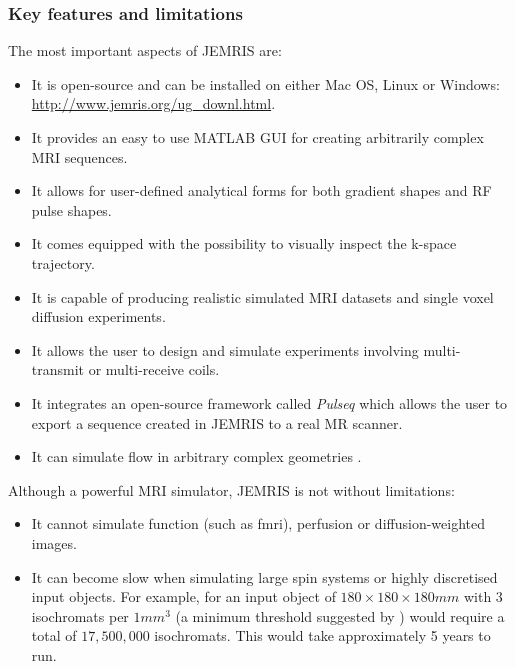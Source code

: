 \subsubsection{Key features and limitations}
The most important aspects of JEMRIS are:
\begin{itemize}
    
    \item It is open-source and can be installed on either Mac OS, Linux or Windows: \url{http://www.jemris.org/ug_downl.html}.
    
    \item It provides an easy to use MATLAB GUI for creating arbitrarily complex MRI sequences.
    
    \item It allows for user-defined analytical forms for both gradient shapes and RF pulse shapes. 
    
    \item It comes equipped with the possibility to visually inspect the k-space trajectory.
    
    \item It is capable of producing realistic simulated MRI datasets and single voxel diffusion experiments.
    
    \item It allows the user to design and simulate experiments involving multi-transmit or multi-receive coils.
    
    \item It integrates an open-source framework called \textit{Pulseq} \cite{Layton2017} which allows the user to export a sequence created in JEMRIS to a real MR scanner.
    
    \item It can simulate flow in arbitrary complex geometries \cite{Fortin2016}.
    
\end{itemize}

\hfill

Although a powerful MRI simulator, JEMRIS is not without limitations:
\begin{itemize}
    
    \item It cannot simulate function (such as \ac{fmri}), perfusion or diffusion-weighted images.
    
    \item It can become slow when simulating large spin systems or highly discretised input objects. 
    For example, for an input object of $180 \times 180 \times 180mm$ with 3 isochromats per $1mm^3$ (a minimum threshold suggested by \cite{Shkarin1997}) would require a total of $17,500,000$ isochromats.
    This would take approximately 5 years to run.
    
\end{itemize}

